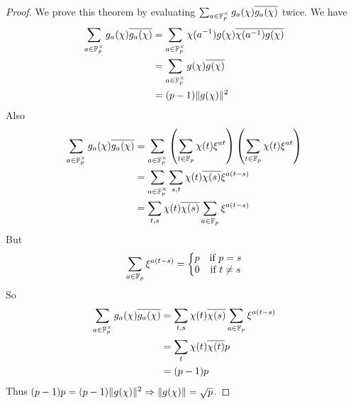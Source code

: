 \begin{proof}
We prove this theorem by evaluating $\sum_{a\in\mathbb{F}_p^\times} g_a(\chi)\overline{g_a(\chi)}$ twice. We have
\begin{align*}
\sum_{a\in\mathbb{F}_p^\times} g_a(\chi)\overline{g_a(\chi)} 
&=\sum_{a\in\mathbb{F}_p^\times} \chi(a^{-1})g(\chi)\overline{\chi(a^{-1})g(\chi)}\\
&=\sum_{a\in\mathbb{F}_p^\times} g(\chi)\overline{g(\chi)}\\
&= (p-1)\|g(\chi)\|^2
\end{align*}
Also
\begin{align*}
\sum_{a\in\mathbb{F}_p^\times} g_a(\chi)\overline{g_a(\chi)} 
&=\sum_{a\in\mathbb{F}_p^\times}\left(\sum_{t\in\mathbb{F}_p}\chi(t)\xi^{at} \right)\left(\sum_{t\in\mathbb{F}_p}\chi(t)\xi^{at} \right)\\
&=\sum_{a\in\mathbb{F}_p^\times}\sum_{s,t}\chi(t)\overline{\chi(s)}\xi^{a(t-s)}\\
&= \sum_{t,s}\chi(t)\overline{\chi(s)}\sum_{a\in\mathbb{F}_p}\xi^{a(t-s)}
\end{align*}
But 
$$\sum_{a\in\mathbb{F}_p}\xi^{a(t-s)}=\left\{\begin{matrix}p & \mbox{if }p=s\\0& \mbox{if }t\ne s\end{matrix}\right.$$So
\begin{align*}
\sum_{a\in\mathbb{F}_p^\times} g_a(\chi)\overline{g_a(\chi)} 
&= \sum_{t,s}\chi(t)\overline{\chi(s)}\sum_{a\in\mathbb{F}_p}\xi^{a(t-s)}\\
&= \sum_t \chi(t)\overline{\chi(t)}p\\
&= (p-1)p
\end{align*}
Thus $(p-1)p=(p-1)\|g(\chi)\|^2\Rightarrow \|g(\chi)\|=\sqrt{p}$.
\end{proof}
